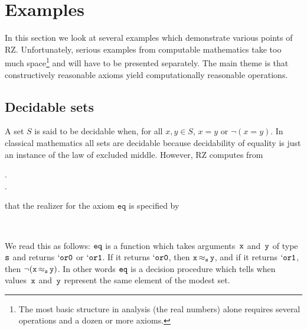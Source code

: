 \section{Examples}
\label{sec:examples}

In this section we look at several examples which demonstrate various
points of RZ. Unfortunately, serious examples from computable
mathematics take too much space\footnote{The most basic structure
  in analysis (the real numbers) alone 
  requires several operations and a dozen or more axioms.} and will have to
be presented separately. The main theme is that constructively
reasonable axioms yield computationally reasonable operations.

\subsection{Decidable sets}
\label{sec:decidable-sets}

A set $S$ is said to be decidable when, for all $x, y \in S$, $x = y$
or $\lnot (x = y)$. In classical mathematics all sets are decidable
because decidability of equality is just an instance of the law of
excluded middle. However, RZ computes from
%
\begin{showInputSmall}
.\\
.\\
\end{showInputSmall}%
%
that the realizer for the axiom $\mathtt{eq}$ is specified by
%
\begin{showOutputSmall}
\\
\oassertion{\f{eq}}{\forall \f{x}, \f{y} : \support{\f{s}}.\ 
(\opcasex{\oapp{\oapp{\f{eq}}{\f{x}}}{\f{y}}}{\texttt{or0}}{\oper{\f{s}}{\f{x}}{\f{y}}}{\texttt{or1}}{\onot{(\oper{\f{s}}{\f{x}}{\f{y}})}})
}
\end{showOutputSmall}%
%
We read this as follows: $\f{eq}$ is a function which takes
arguments~$\f{x}$ and~$\f{y}$ of type~$\f{s}$ and returns
$\mathtt{`or0}$ or $\mathtt{`or1}$. If it returns $\mathtt{`or0}$,
then $\oper{\f{s}}{\f{x}}{\f{y}}$, and if it returns
$\mathtt{`or1}$, then $\onot{(\oper{\f{s}}{\f{x}}{\f{y}})}$. In
other words $\f{eq}$ is a decision procedure which tells when
values~$\f{x}$ and~$\f{y}$ represent the same element of the modest
set.

